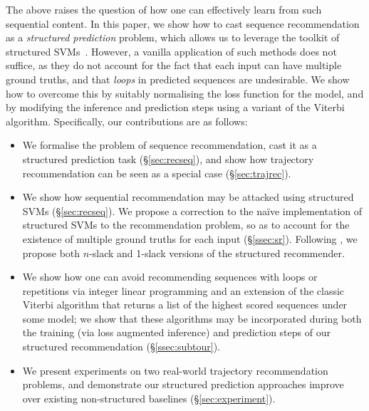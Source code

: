 The above raises the question of how one can effectively learn from such sequential content.
In this paper, we show how to cast sequence recommendation as a \emph{structured prediction} problem,
which allows us to leverage the toolkit of structured SVMs~\citep{tsochantaridis2005large}.
However, a vanilla application of such methods does not suffice,
as they do not account for the fact that each input can have multiple ground truths,
and that \emph{loops} in predicted sequences are undesirable.
We show how to overcome this by
suitably normalising the loss function for the model,
and by modifying the inference and prediction steps using a variant of the Viterbi algorithm.
Specifically, our contributions are as follows:
\begin{itemize}[noitemsep,leftmargin=12pt]\itemmoveup
	\item We formalise the problem of sequence recommendation, cast it as a structured prediction task (\S\ref{sec:recseq}), and show how trajectory recommendation can be seen as a special case (\S\ref{sec:trajrec}).

	\item We show how sequential recommendation may be attacked using structured SVMs (\S\ref{sec:recseq}).
	We propose a correction to the na\"{i}ve implementation of structured SVMs to the recommendation problem, so as to account for the existence of multiple ground truths for each input (\S\ref{ssec:sr}). Following \citep{joachims2009cutting}, we propose both $n$-slack and 1-slack versions of the structured recommender.%
	
	\item We show how one can avoid recommending sequences with loops or repetitions via integer linear programming and an extension of the classic Viterbi algorithm that returns a list of the highest scored sequences under some model; we show that these algorithms may be incorporated during both the training (via loss augmented inference) and prediction steps of our structured recommendation (\S\ref{ssec:subtour}).
	
	\item We present experiments on two real-world trajectory recommendation problems, and demonstrate our structured prediction approaches improve over existing non-structured baselines (\S\ref{sec:experiment}).\itemmoveup
\end{itemize}

